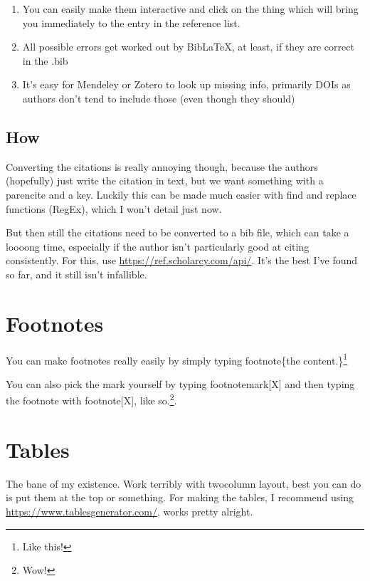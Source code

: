 \documentclass[twocolumn, serif]{jote-article}
\begin{document}
\begin{enumerate}
    \item You can easily make them interactive and click on the thing which will bring you immediately to the entry in the reference list.
    \item All possible errors get worked out by BibLaTeX, at least, if they are correct in the .bib
    \item It's easy for Mendeley or Zotero to look up missing info, primarily DOIs as authors don't tend to include those (even though they should)
\end{enumerate}

\subsection*{How}

Converting the citations is really annoying though, because the authors (hopefully) just write the citation in text, but we want something with a parencite and a key. Luckily this can be made much easier with find and replace functions (RegEx), which I won't detail just now.

But then still the citations need to be converted to a bib file, which can take a loooong time, especially if the author isn't particularly good at citing consistently. For this, use \url{https://ref.scholarcy.com/api/}. It's the best I've found so far, and it still isn't infallible.

{}
\section*{Footnotes}

You can make footnotes really easily by simply typing footnote\{the content.\}\footnote{Like this!}

You can also pick the mark yourself by typing footnotemark[X] and then typing the footnote with footnote[X], like so.\footnote[99]{Wow!}.

{}
\section*{Tables}

The bane of my existence. Work terribly with twocolumn layout, best you can do is put them at the top or something. For making the tables, I recommend using \url{https://www.tablesgenerator.com/}, works pretty alright.
\end{document}
